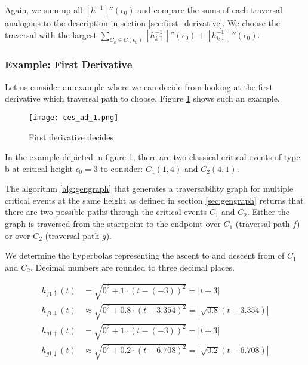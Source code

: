 Again, we sum up all $[h^{-1}]''(\epsilon_0)$ and compare the sums of each traversal analogous to the description in section \ref{sec:first_derivative}. We choose the traversal with the largest $\sum\nolimits_{C_k \in C(\epsilon_0)}[h_{k\uparrow}^{-1}]''(\epsilon_0) + [h_{k\downarrow}^{-1}]''(\epsilon_0)$.


\subsubsection{Example: First Derivative}

Let us consider an example where we can decide from looking at the first derivative which traversal path to choose. Figure \ref{fig:ces_ad_1} shows such an example.

 \begin{figure}[H]
    \centering
    
    \texttt{[image: ces\_ad\_1.png]}
		
	\caption{First derivative decides\protect\footnotemark}
    \label{fig:ces_ad_1}
\end{figure}

In the example depicted in figure \ref{fig:ces_ad_1}, there are two classical critical events of type b at critical height $\epsilon_0 = 3$ to consider: $C_1(1, 4)$ and $C_2(4, 1)$.

The algorithm \ref{alg:gengraph} that generates a traversability graph for multiple critical events at the same height as defined in section \ref{sec:gengraph} returns that there are two possible paths through the critical events $C_1$ and $C_2$. Either the graph is traversed from the startpoint to the endpoint over $C_1$ (traversal path $f$) or over $C_2$ (traversal path $g$).

We determine the hyperbolas representing the ascent to and descent from of $C_1$ and $C_2$. Decimal numbers are rounded to three decimal places.

\begin{align*}
	h_{f1\uparrow}(t) &= \sqrt{0^2 + 1\cdot(t - (-3))^2} = \left| t + 3 \right|\\
	h_{f1\downarrow}(t) &\approx \sqrt{0^2 + 0.8\cdot(t - 3.354)^2} = \left| \sqrt{0.8}(t - 3.354) \right|\\
	h_{g1\uparrow}(t) &= \sqrt{0^2 + 1\cdot(t - (-3))^2} = \left| t + 3 \right|\\
	h_{g1\downarrow}(t) &\approx \sqrt{0^2 + 0.2\cdot(t - 6.708)^2} = \left| \sqrt{0.2}(t - 6.708) \right|
\end{align*}

